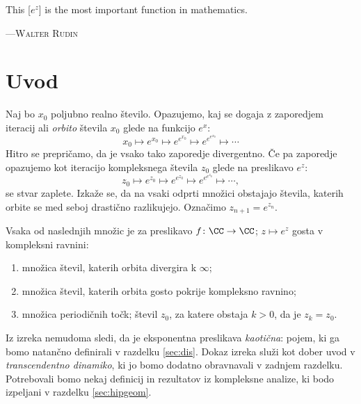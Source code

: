 \let\origthefootnote\thefootnote
\renewcommand{\thefootnote}{\fnsymbol{footnote}}

\epigraph{
    This \textup{[\(e^z\)]} is the most important function in mathematics.
    }{
        \textsc{---Walter Rudin}\footnotemark
    }
        

\let\thefootnote\origthefootnote

\section{Uvod} \label{sec:intro}

Naj bo \(x_0\) poljubno realno število. Opazujemo, kaj se dogaja z zaporedjem iteracij ali \emph{orbito} števila \(x_0\) glede na funkcijo \(e^{x}\):
\[x_0 \mapsto e^{x_0} \mapsto e^{e^{x_0}} \mapsto e^{e^{e^{x_0}}} \mapsto \cdots\]
Hitro se prepričamo, da je vsako tako zaporedje divergentno. Če pa zaporedje opazujemo kot iteracijo kompleksnega števila \(z_0\) glede na preslikavo \(e^z\):
\[z_0 \mapsto e^{z_0} \mapsto e^{e^{z_0}} \mapsto e^{e^{e^{z_0}}} \mapsto \cdots,\]
se stvar zaplete. Izkaže se, da na vsaki odprti množici obstajajo števila, katerih orbite se med seboj drastično razlikujejo. Označimo \(z_{n + 1} = e^{z_n}\).

\begin{izrek} \label{thm:orbits}
    Vsaka od naslednjih množic je za preslikavo \(f \colon \CC \to \CC\); \(z \mapsto e^{z}\) gosta v kompleksni ravnini:
    \begin{enumerate}
        \item množica števil, katerih orbita divergira k \(\infty\);
        \item množica števil, katerih orbita gosto pokrije kompleksno ravnino;
        \item množica periodičnih točk; števil \(z_0\), za katere obstaja \(k > 0\), da je \(z_k = z_0\).
    \end{enumerate}
\end{izrek}

\noindent Iz izreka nemudoma sledi, da je eksponentna preslikava \emph{kaotična}: pojem, ki ga bomo natančno definirali v razdelku \ref{sec:dis}. Dokaz izreka služi kot dober uvod v \emph{transcendentno dinamiko}, ki jo bomo dodatno obravnavali v zadnjem razdelku. Potrebovali bomo nekaj definicij in rezultatov iz kompleksne analize, ki bodo izpeljani v razdelku \ref{sec:hipgeom}.

